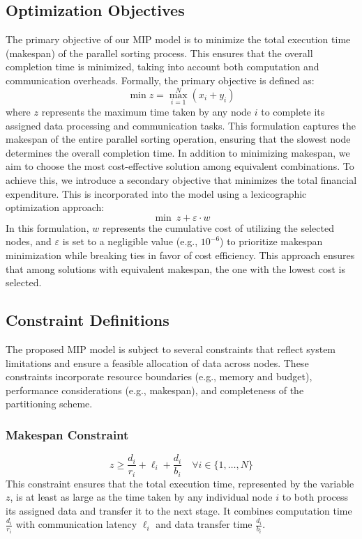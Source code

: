 \documentclass[]{interact}
\theoremstyle{plain}
\theoremstyle{definition}
\theoremstyle{remark}
\begin{document}
\subsection{Optimization Objectives}
The primary objective of our MIP model is to minimize the total execution time (makespan) of the parallel sorting process. This ensures that the overall completion time is minimized, taking into account both computation and communication overheads. Formally, the primary objective is defined as:
\begin{equation}
    \min z = \max_{i=1}^N (x_i + y_i)
\end{equation}
where $z$ represents the maximum time taken by any node $i$ to complete its assigned data processing and communication tasks. This formulation captures the makespan of the entire parallel sorting operation, ensuring that the slowest node determines the overall completion time. In addition to minimizing makespan, we aim to choose the most cost-effective solution among equivalent combinations. To achieve this, we introduce a secondary objective that minimizes the total financial expenditure. This is incorporated into the model using a lexicographic optimization approach:
\begin{equation}
    \min \ z + \varepsilon \cdot w
\end{equation}
In this formulation, $w$ represents the cumulative cost of utilizing the selected nodes, and $\varepsilon$ is set to a negligible value (e.g., $10^{-6}$) to prioritize makespan minimization while breaking ties in favor of cost efficiency. This approach ensures that among solutions with equivalent makespan, the one with the lowest cost is selected.

\subsection{Constraint Definitions}

The proposed MIP model is subject to several constraints that reflect system limitations and ensure a feasible allocation of data across nodes. These constraints incorporate resource boundaries (e.g., memory and budget), performance considerations (e.g., makespan), and completeness of the partitioning scheme.

\subsubsection{Makespan Constraint}
\begin{equation}
    z \geq \frac{d_i}{r_i} + \ell_i + \frac{d_i}{b_i} \quad \forall i \in \{1, \ldots, N\}
\end{equation}
This constraint ensures that the total execution time, represented by the variable $z$, is at least as large as the time taken by any individual node $i$ to both process its assigned data and transfer it to the next stage. It combines computation time $\frac{d_i}{r_i}$ with communication latency $\ell_i$ and data transfer time $\frac{d_i}{b_i}$.
\end{document}
